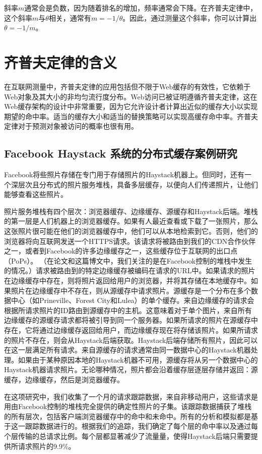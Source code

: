斜率$m$通常会是负数，因为随着排名的增加，频率通常会下降。在齐普夫定律中，这个斜率$m$与$\theta$相关，通常有$m=−1/\theta$。因此，通过测量这个斜率，你可以计算出$\theta=−1/m$。
\section{齐普夫定律的含义}

在互联网测量中，齐普夫定律的应用包括但不限于Web缓存的有效性，它依赖于Web对象及其大小的非均匀流行度分布。Web访问已被证明遵循齐普夫定律，这在Web缓存架构的设计中非常重要，因为它允许设计者计算出近似的缓存大小以实现期望的命中率。适当的缓存大小和适当的替换策略可以实现高缓存命中率。齐普夫定律对于预测对象被访问的概率也很有用。

\subsection{Facebook Haystack 系统的分布式缓存案例研究}

Facebook将些照片存储在专门用于存储照片的Haystack机器上。但同时，还有一个深层次且分布式的照片服务堆栈，具备多层缓存，以便向人们传递照片，让他们能够查看这些照片。

照片服务堆栈有四个层次：浏览器缓存、边缘缓存、源缓存和Haystack后端。堆栈的第一层是人们机器上的浏览器缓存。如果有人最近查看或下载了一张照片，那么这张照片很可能在他们的浏览器缓存中，他们可以从本地检索到它。否则，他们的浏览器将向互联网发送一个HTTPS请求。该请求将被路由到我们的CDN合作伙伴之一，或者到Facebook的许多边缘缓存之一，这些缓存位于互联网的出口点（PoPs）。 （在论文和这篇博文中，我们关注的是在Facebook控制的堆栈中发生的情况。）请求被路由到的特定边缘缓存被编码在请求的URL中。如果请求的照片在边缘缓存中存在，则将照片返回给用户的浏览器，并将其存储在本地缓存中。如果照片在边缘缓存中不存在，则从源缓存中请求照片。源缓存是一个分布在多个数据中心（如Prineville、Forest City和Lulea）的单个缓存。来自边缘缓存的请求会根据所请求照片的ID路由到源缓存中的主机。这意味着对于单个图片，来自所有边缘缓存的源缓存请求都将被引导到同一个服务器。如果所请求的照片在源缓存中存在，它将通过边缘缓存返回给用户，而边缘缓存现在将存储该照片。如果所请求的照片不存在，则会从Haystack后端获取。Haystack后端存储所有照片，因此可以在这一层满足所有请求。来自源缓存的请求通常由同一数据中心的Haystack机器处理。如果由于某种原因本地的Haystack机器不可用，源缓存将从另一个数据中心的Haystack机器请求照片。无论哪种情况，照片都会沿着缓存层逐层存储并返回：源缓存，边缘缓存，然后是浏览器缓存。

在这项研究中，我们收集了一个月的请求跟踪数据，来自非移动用户，这些请求是用由Facebook控制的堆栈完全提供的确定性照片的子集。该跟踪数据捕获了堆栈的所有层次，包括客户端浏览器缓存中的命中和未命中。所有的分析和模拟都是基于这一跟踪数据进行的。根据我们的追踪，我们确定了每个层的命中率以及通过每个层传输的总请求比例。每个层都显著减少了流量量，使得Haystack后端只需要提供所请求照片的9.9\%。

